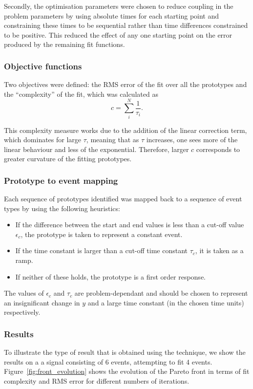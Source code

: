 Secondly, the optimisation parameters were chosen to reduce coupling
in the problem parameters by using absolute times for each starting
point and constraining these times to be sequential rather than time
differences constrained to be positive.  This reduced the effect of
any one starting point on the error produced by the remaining fit
functions.

\subsubsection{Objective functions}
Two objectives were defined: the RMS error of the fit over all the
prototypes and the ``complexity'' of the fit, which was calculated as
\begin{equation}
  c = \sum_i^{N} \frac{1}{\tau_i}.
\end{equation}

This complexity measure works due to the addition of the linear
correction term, which dominates for large $\tau$, meaning that as
$\tau$ increases, one sees more of the linear behaviour and less of
the exponential.  Therefore, larger $c$ corresponds to greater
curvature of the fitting prototypes.

\subsubsection{Prototype to event mapping}
Each sequence of prototypes identified was mapped back to a sequence
of event types by using the following heuristics:
\begin{itemize}
\item If the difference between the start and end values is less
  than a cut-off value $\epsilon_c$, the prototype is taken to
  represent a constant event.
\item If the time constant is larger than a cut-off time constant
  $\tau_c$, it is taken as a ramp.
\item If neither of these holds, the prototype is a first order response.
\end{itemize}

The values of $\epsilon_c$ and $\tau_c$ are problem-dependant and
should be chosen to represent an insignificant change in $y$ and a
large time constant (in the chosen time units) respectively.


\subsubsection{Results}
To illustrate the type of result that is obtained using the technique,
we show the results on a a signal consisting of 6 events, attempting
to fit 4 events.  Figure~\ref{fig:front_evolution} shows the evolution
of the Pareto front in terms of fit complexity and RMS error for
different numbers of iterations.

